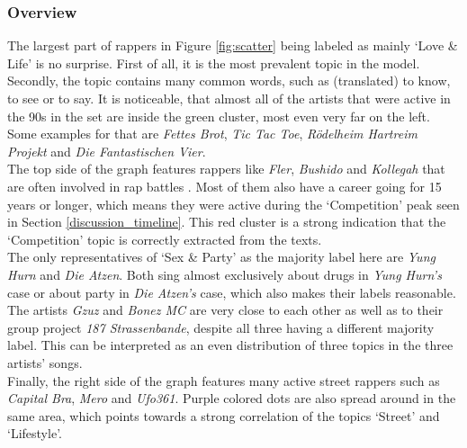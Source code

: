 \documentclass[conference]{IEEEtran}
\begin{document}
\subsubsection{Overview}
The largest part of rappers in Figure \ref{fig:scatter} being labeled as mainly {\lq}Love \& Life{\rq} is no surprise. First of all, it is the most prevalent topic in the model. Secondly, the topic contains many common words, such as (translated) to know, to see or to say. It is noticeable, that almost all of the artists that were active in the 90s in the set are inside the green cluster, most even very far on the left. Some examples for that are \textit{Fettes Brot}, \textit{Tic Tac Toe}, \textit{R\"odelheim Hartreim Projekt} and \textit{Die Fantastischen Vier}.\\
The top side of the graph features rappers like \textit{Fler}, \textit{Bushido} and \textit{Kollegah} that are often involved in rap battles \cite{battles}. Most of them also have a career going for 15 years or longer, which means they were active during the {\lq}Competition{\rq} peak seen in Section \ref{discussion_timeline}. This red cluster is a strong indication that the {\lq}Competition{\rq} topic is correctly extracted from the texts.\\
The only representatives of {\lq}Sex \& Party{\rq} as the majority label here are \textit{Yung Hurn} and \textit{Die Atzen}. Both sing almost exclusively about drugs in \textit{Yung Hurn's} case or about party in \textit{Die Atzen's} case, which also makes their labels reasonable.\\
The artists \textit{Gzuz} and \textit{Bonez MC} are very close to each other as well as to their group project \textit{187 Strassenbande}, despite all three having a different majority label. This can be interpreted as an even distribution of three topics in the three artists' songs.\\
Finally, the right side of the graph features many active street rappers \cite{strassenrap} such as \textit{Capital Bra}, \textit{Mero} and \textit{Ufo361}. Purple colored dots are also spread around in the same area, which points towards a strong correlation of the topics {\lq}Street{\rq} and {\lq}Lifestyle{\rq}.
\end{document}

